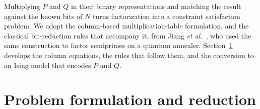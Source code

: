 \documentclass[pdflatex,sn-apa]{sn-jnl}%
\theoremstyle{thmstyleone}%
\theoremstyle{thmstyletwo}%
\theoremstyle{thmstylethree}%
\begin{document}
Multiplying $P$ and $Q$ in their binary representations and matching the result against the known bits of $N$ turns factorization into a constraint satisfaction problem. We adopt the column-based multiplication-table formulation, and the classical bit-reduction rules that accompany it, from Jiang \emph{et al.}~\citeyearpar{Jiang2018}, who used the same construction to factor semiprimes on a quantum annealer. Section~\ref{sec:preproc} develops the column equations, the rules that follow them, and the conversion to an Ising model that encodes $P$ and $Q$.

\section{Problem formulation and reduction}\label{sec:preproc}
\end{document}
